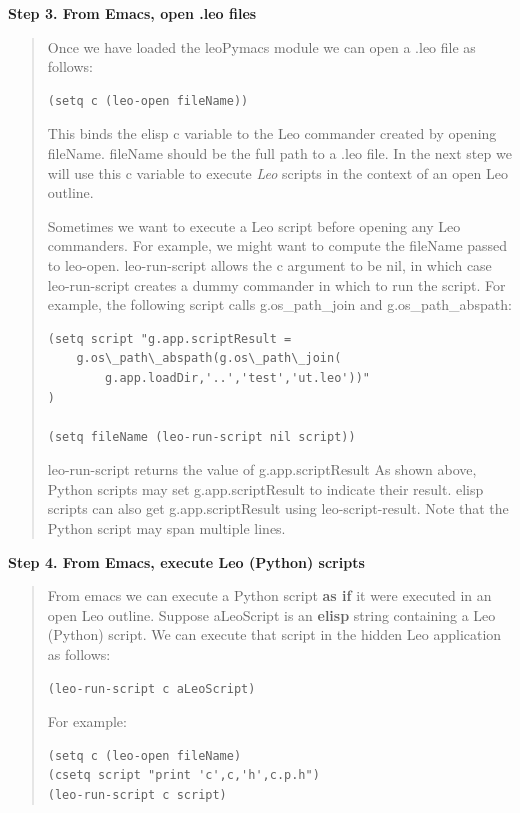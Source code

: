 \documentclass[a4paper,10pt,english]{sphinxmanual}
\begin{document}
\textbf{Step 3. From Emacs, open .leo files}
\begin{quote}

Once we have loaded the leoPymacs module
we can open a .leo file as follows:

\begin{Verbatim}[commandchars=\\\{\}]
(setq c (leo-open fileName))
\end{Verbatim}

This binds the elisp c variable to the Leo commander created by opening fileName.
fileName should be the full path to a .leo file.
In the next step we will use this c variable to execute \emph{Leo} scripts in the
context of an open Leo outline.

Sometimes we want to execute a Leo script before opening any Leo commanders.
For example, we might want to compute the fileName passed to leo-open.
leo-run-script allows the c argument to be nil,
in which case leo-run-script creates a dummy commander in which to run the script.
For example, the following script calls g.os\_path\_join and g.os\_path\_abspath:

\begin{Verbatim}[commandchars=\\\{\}]
(setq script "g.app.scriptResult =
    g.os\_path\_abspath(g.os\_path\_join(
        g.app.loadDir,'..','test','ut.leo'))"
)

(setq fileName (leo-run-script nil script))
\end{Verbatim}

leo-run-script returns the value of g.app.scriptResult
As shown above, Python scripts may set g.app.scriptResult to indicate their result.
elisp scripts can also get g.app.scriptResult using leo-script-result.
Note that the Python script may span multiple lines.
\end{quote}

\textbf{Step 4. From Emacs, execute Leo (Python) scripts}
\begin{quote}

From emacs we can execute a Python script \textbf{as if} it were executed in an
open Leo outline.
Suppose aLeoScript is an \textbf{elisp} string containing a Leo (Python) script.
We can execute that script in the hidden Leo application as follows:

\begin{Verbatim}[commandchars=\\\{\}]
(leo-run-script c aLeoScript)
\end{Verbatim}

For example:

\begin{Verbatim}[commandchars=\\\{\}]
(setq c (leo-open fileName)
(csetq script "print 'c',c,'h',c.p.h")
(leo-run-script c script)
\end{Verbatim}
\end{quote}
\end{document}
